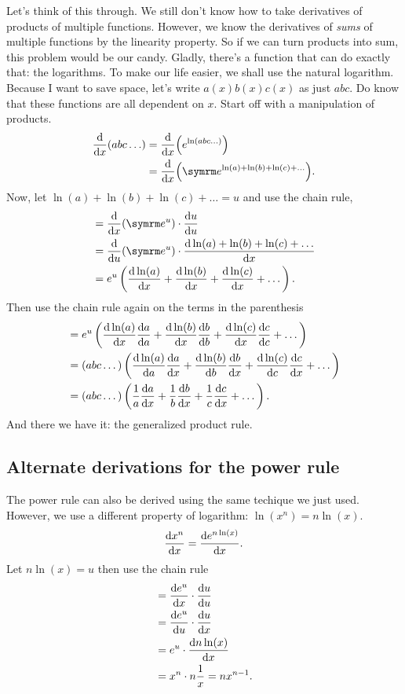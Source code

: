 Let's think of this through. We still don't know how to take derivatives of products of multiple functions. However, we know the derivatives of \emph{sums} of multiple functions by the linearity property. So if we can turn products into sum, this problem would be our candy. Gladly, there's a function that can do exactly that: the logarithms. To make our life easier, we shall use the natural logarithm. Because I want to save space, let's write $a(x)b(x)c(x)$ as just $abc$. Do know that these functions are all dependent on $x$. Start off with a manipulation of products.
\begin{align*}
    \dv{x}(abc\dots) &= \dv{x}(e^{\ln(abc\dots)}) \\
    &= \dv{x}(\e^{\ln(a) + \ln(b) + \ln(c) + \dots}).
\end{align*}
Now, let $\ln(a) + \ln(b) + \ln(c) + \dots = u$ and use the chain rule,
\begin{align*}
    &= \dv{x}(\e^u) \cdot \dv{u}{u} \\
    &= \dv{u}(\e^u) \cdot \dv{\ln(a) + \ln(b) + \ln(c) + \dots}{x} \\
    &= e^u \left(\dv{\ln(a)}{x} + \dv{\ln(b)}{x} + \dv{\ln(c)}{x} + \dots\right).
\end{align*}
Then use the chain rule again on the terms in the parenthesis
\begin{align*}
    &= e^u \left(\dv{\ln(a)}{x}\dv{a}{a} + \dv{\ln(b)}{x}\dv{b}{b} + \dv{\ln(c)}{x}\dv{c}{c} + \dots\right) \\
    &= (abc\dots)\left(\dv{\ln(a)}{a}\dv{a}{x} + \dv{\ln(b)}{b}\dv{b}{x} + \dv{\ln(c)}{c}\dv{c}{x} + \dots\right) \\
    &= (abc\dots)\left(\frac{1}{a}\dv{a}{x} + \frac{1}{b}\dv{b}{x} + \frac{1}{c}\dv{c}{x} + \dots\right).
\end{align*}
And there we have it: the generalized product rule.

\subsection{Alternate derivations for the power rule}

The power rule can also be derived using the same techique we just used. However, we use a different property of logarithm: $\ln(x^n) = n\ln(x)$.
\begin{equation*}
    \dv{x^n}{x} = \dv{e^{n\ln(x)}}{x}.
\end{equation*}
Let $n\ln(x) = u$ then use the chain rule
\begin{align*}
    &= \dv{e^u}{x} \cdot \dv{u}{u} \\
    &= \dv{e^u}{u} \cdot \dv{u}{x} \\
    &= e^u \cdot \dv{n\ln(x)}{x} \\
    &= x^n \cdot n\frac{1}{x} = nx^{n - 1}.
\end{align*}

